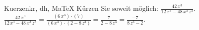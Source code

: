 \begin{MAufgabe}{Kuerzen}{kr, dh, MaTeX}
K\"urzen Sie soweit m\"oglich: $\frac{42\, x^3}{12\, x^3 - 48\, x^3\, z^3}$.\\ 
\ifLsg\MLoesung
\quad $\frac{42\, x^3}{12\, x^3 - 48\, x^3\, z^3}=\frac{(6\, x^3)\cdot(7)}{(6\, x^3)\cdot(2 - 8\, z^3)}=\frac{7}{2 - 8\, z^3}=\frac{-7}{8\, z^3 - 2}$.\else\relax\fi
 \end{MAufgabe}